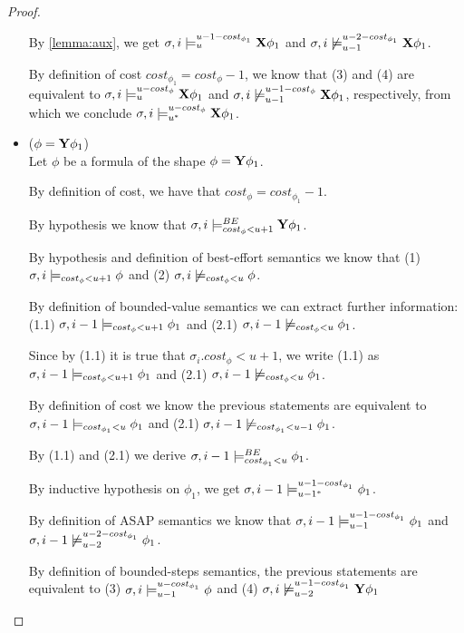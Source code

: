 \begin{theorem}
\begin{proof}
\begin{itemize}
    By \autoref{lemma:aux}, we get $\sigma,i \models_{u}^{u-1-cost_{\phi_1}} \mathbf{X} \phi_1$ and $\sigma,i \not\models_{u-1}^{u-2-cost_{\phi_1}} \mathbf{X} \phi_1$.
    
    By definition of cost $cost_{\phi_1} = cost_\phi - 1$, we know that (3) and (4) are equivalent to $\sigma,i \models_{u}^{u-cost_\phi} \mathbf{X} \phi_1$ and $\sigma,i \not\models_{u-1}^{u-1-cost_\phi} \mathbf{X} \phi_1$, respectively, from which we conclude $\sigma,i \models_{{u}^*}^{u-cost_\phi} \mathbf{X} \phi_1$.

    \item ($\phi = \mathbf{Y} \phi_1$) \\
    Let $\phi$ be a formula of the shape $\phi = \mathbf{Y} \phi_1$.
    
    By definition of cost, we have that $cost_\phi = cost_{\phi_1} - 1$.
    
    By hypothesis we know that $\sigma,i \models_{cost_\phi < u + 1}^{BE} \mathbf{Y} \phi_1$.
    
    By hypothesis and definition of best-effort semantics we know that (1) $\sigma,i \models_{cost_\phi < u + 1} \phi$ and (2) $\sigma,i \not\models_{cost_\phi < u} \phi$.
    
    By definition of bounded-value semantics we can extract further information: (1.1) $\sigma,i-1 \models_{cost_\phi < u + 1} \phi_1$ and (2.1) $\sigma,i-1 \not\models_{cost_\phi < u} \phi_1$.
    
    Since by (1.1) it is true that $\sigma_i.cost_\phi < u + 1$, we write (1.1) as $\sigma,i-1 \models_{cost_\phi < u + 1} \phi_1$ and (2.1) $\sigma,i-1 \not\models_{cost_\phi < u} \phi_1$.
    
    By definition of cost we know the previous statements are equivalent to $\sigma,i-1 \models_{cost_{\phi_1} < u} \phi_1$ and (2.1) $\sigma,i-1 \not\models_{cost_{\phi_1} < u - 1} \phi_1$.
    
    By (1.1) and (2.1) we derive $\sigma,i-1 \models_{cost_{\phi_1} < u}^{BE} \phi_1$.
 
    By inductive hypothesis on $\phi_1$, we get $\sigma,i-1 \models_{{u-1}^*}^{u-1-cost_{\phi_1}} \phi_1$.
    
    By definition of ASAP semantics we know that $\sigma,i-1 \models_{u-1}^{u-1-cost_{\phi_1}} \phi_1$ and $\sigma,i-1 \not\models_{u-2}^{u-2-cost_{\phi_1}} \phi_1$.
    
    By definition of bounded-steps semantics, the previous statements are equivalent to (3) $\sigma,i \models_{u-1}^{u-cost_{\phi_1}} \phi$ and (4) $\sigma,i \not\models_{u-2}^{u-1-cost_{\phi_1}} \mathbf{Y} \phi_1$
    

\end{itemize}
\end{proof}
\end{theorem}
